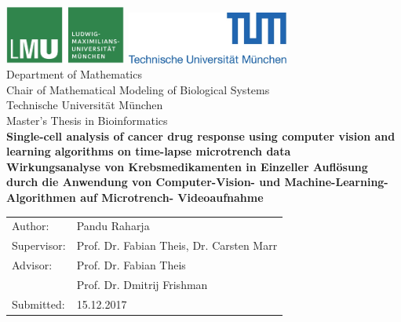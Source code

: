 \documentclass[pdftex,12pt,a4paper]{report}
\begin{document}
\begin{titlepage}
{\sffamily


\begin{center}
\includegraphics[width=0.3\textwidth]{logo2.jpg}
\hfill
\includegraphics[width=0.4\textwidth]{logo1.jpg}  
\\[1.5cm]  

{\Large Department of Mathematics}\\[0.5cm]
{\Large Chair of Mathematical Modeling of Biological Systems}\\[0.5cm]
{Technische Universit\"at M\"unchen}\\[1cm]

{\Large Master's Thesis in Bioinformatics}\\[2cm]
{\textbf{\Large Single-cell analysis of cancer drug response using computer vision and learning algorithms on time-lapse microtrench data}}\\[2cm]
{\textbf{\Large Wirkungsanalyse von Krebsmedikamenten in Einzeller Aufl\"osung durch die Anwendung von Computer-Vision- und Machine-Learning-Algorithmen auf Microtrench- Videoaufnahme}}\\[4cm]

\end{center}
\begin{center}\Large
  \begin{tabular}{ll}
    Author:& Pandu Raharja\\
    Supervisor: &  Prof. Dr. Fabian Theis, Dr. Carsten Marr\\
    Advisor:        &  Prof. Dr. Fabian Theis\\
    & Prof. Dr. Dmitrij Frishman\\
    Submitted:     &  15.12.2017
  \end{tabular}
\end{center}

}%

\end{titlepage}


\end{document}
